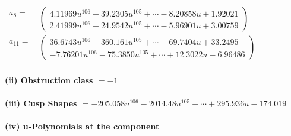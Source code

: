 \documentclass[1p]{elsarticle_modified}
\theoremstyle{definition}
\begin{document}
\begin{tabular}{m{7pt} m{180pt} m{7pt} m{180pt} }
\flushright $a_{8}=$&$\begin{pmatrix}4.11969 u^{106}+39.2305 u^{105}+\cdots-8.20858 u+1.92021\\2.41999 u^{106}+24.9542 u^{105}+\cdots-5.96901 u+3.00759\end{pmatrix}$ \\
\flushright $a_{11}=$&$\begin{pmatrix}36.6743 u^{106}+360.161 u^{105}+\cdots-69.7404 u+33.2495\\-7.76201 u^{106}-75.3850 u^{105}+\cdots+12.3022 u-6.96486\end{pmatrix}$\\&\end{tabular}
\flushleft \textbf{(ii) Obstruction class $= -1$}\\~\\
\flushleft \textbf{(iii) Cusp Shapes $= -205.058 u^{106}-2014.48 u^{105}+\cdots+295.936 u-174.019$}\\~\\
\newpage\renewcommand{\arraystretch}{1}
\flushleft \textbf{(iv) u-Polynomials at the component}\newline \\
\end{document}

